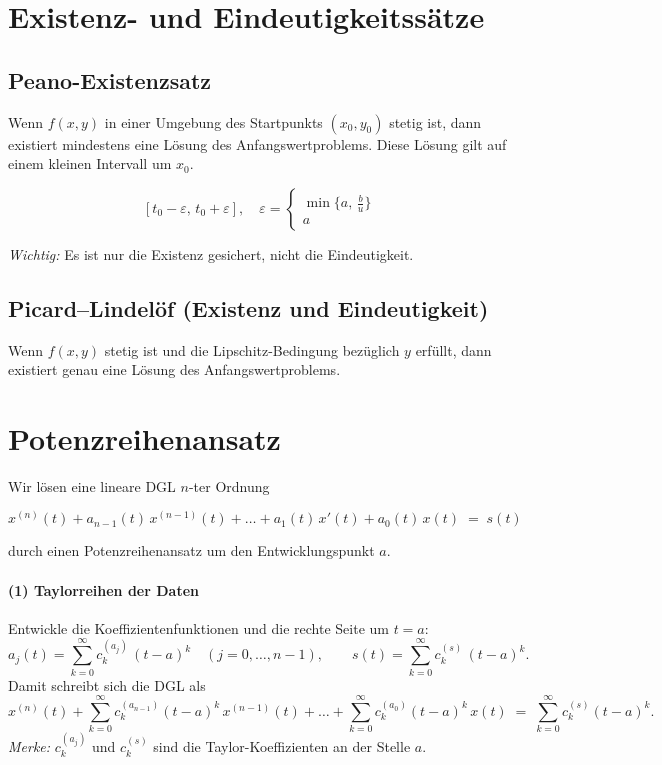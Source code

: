 \documentclass[a4paper,11pt,oneside,open=any,parskip=half, DIV=15]{scrreprt}
\begin{document}
\section{Existenz- und Eindeutigkeitssätze}

   \subsection*{Peano-Existenzsatz}
      Wenn \(f(x,y)\) in einer Umgebung des Startpunkts \((x_0,y_0)\) stetig ist, 
      dann existiert mindestens eine Lösung des Anfangswertproblems. 
      Diese Lösung gilt auf einem kleinen Intervall um \(x_0\). 

   \begin{importantbox}
      \[
         [t_0 - \varepsilon,\, t_0 + \varepsilon],\quad
         \varepsilon = \left\{
         \begin{array}{l}
         \min\{a,\, \frac{b}{u}\}\\[0.2em]
         a
         \end{array}
         \right.
      \]
   \end{importantbox}

   \textit{Wichtig:} Es ist nur die Existenz gesichert, nicht die Eindeutigkeit.

   \subsection*{Picard–Lindelöf (Existenz und Eindeutigkeit)}
      Wenn \(f(x,y)\) stetig ist und die Lipschitz-Bedingung bezüglich \(y\) erfüllt, 
      dann existiert genau eine Lösung des Anfangswertproblems.  

\section{Potenzreihenansatz}

   Wir lösen eine lineare DGL \(n\)-ter Ordnung
   \begin{importantbox}
      \[
         x^{(n)}(t) + a_{n-1}(t)\,x^{(n-1)}(t) + \ldots + a_1(t)\,x'(t) + a_0(t)\,x(t) \;=\; s(t)  %
      \]
   \end{importantbox}

   durch einen Potenzreihenansatz um den Entwicklungspunkt \(a\).

   \paragraph{(1) Taylorreihen der Daten}
      Entwickle die Koeffizientenfunktionen und die rechte Seite um \(t=a\):
      \[
         a_j(t)=\sum_{k=0}^{\infty} c^{(a_j)}_{k}\,(t-a)^k \quad (j=0,\dots,n-1),   %
         \qquad
         s(t)=\sum_{k=0}^{\infty} c^{(s)}_{k}\,(t-a)^k.  %
      \]
      Damit schreibt sich die DGL als
      \[
         x^{(n)}(t)
         +\sum_{k=0}^{\infty} c^{(a_{n-1})}_{k}(t-a)^k\,x^{(n-1)}(t) %
         +\dots
         +\sum_{k=0}^{\infty} c^{(a_{0})}_{k}(t-a)^k\,x(t)  %
         \;=\;
         \sum_{k=0}^{\infty} c^{(s)}_{k}(t-a)^k.   %
      \]
      \emph{Merke:} \(c^{(a_j)}_{k}\) und \(c^{(s)}_{k}\) sind die Taylor-Koeffizienten an der Stelle \(a\).
\end{document}
